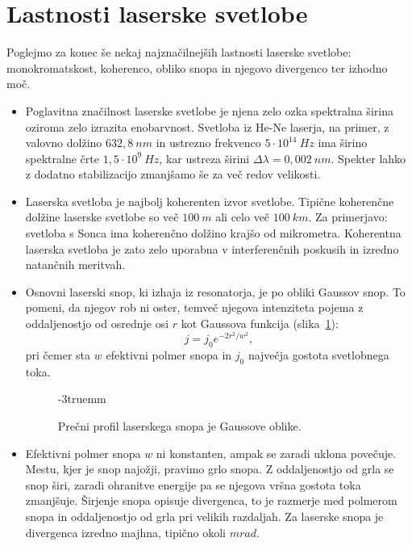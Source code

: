 \section{Lastnosti laserske svetlobe}
Poglejmo za konec še nekaj najznačilnejših lastnosti laserske svetlobe: 
monokromatskost, koherenco, obliko snopa in njegovo divergenco ter izhodno moč. 
\begin{itemize}
\item Poglavitna značilnost laserske svetlobe je njena zelo ozka 
spektralna
širina oziroma zelo izrazita enobarvnost. Svetloba iz He-Ne laserja,
na primer, z valovno dolžino $632,8~\si{nm}$ in ustrezno frekvenco $
5 \cdot 10^{14}~\si{Hz}$ ima širino spektralne črte 
$1,5 \cdot 10^{9}~\si{Hz}$, kar ustreza širini $\Delta \lambda = 0,002~\si{nm}$.
Spekter lahko z dodatno stabilizacijo 
zmanjšamo še za več redov velikosti. 

\item Laserska svetloba je najbolj koherenten izvor svetlobe. Tipične 
koherenčne dolžine laserske svetlobe so več $100~\si{m}$ ali celo
več $100~\si{km}$. Za primerjavo: svetloba s Sonca ima koherenčno dolžino
krajšo od mikrometra. Koherentna laserska svetloba je zato zelo uporabna
v interferenčnih poskusih in izredno natančnih meritvah.

\item Osnovni laserski snop, ki izhaja iz resonatorja, je po obliki
Gaussov snop. To pomeni, da njegov rob ni oster, temveč njegova 
intenziteta pojema z oddaljenostjo
od osrednje osi $r$ kot Gaussova funkcija (slika~\ref{fig:11_Gauss}):
\begin{equation}
j = j_0 e^{-2r^2/w^2},
\end{equation}
pri čemer sta $w$ efektivni polmer snopa in $j_0$ največja gostota
svetlobnega toka. 
\begin{figure}[ht!]
\centering
\def\svgwidth{60truemm} 

\caption{Prečni profil laserskega snopa je Gaussove oblike.
}
\label{fig:11_Gauss}
\vglue-3truemm
\end{figure}
\item Efektivni polmer snopa $w$ ni konstanten, ampak
se zaradi uklona povečuje. Mestu, kjer je snop najožji, pravimo grlo snopa.
Z oddaljenostjo od grla se snop širi, zaradi ohranitve energije pa 
se njegova vršna gostota toka zmanjšuje. Širjenje snopa opisuje divergenca, to je razmerje med 
polmerom  snopa in oddaljenostjo od grla pri velikih razdaljah. 
Za laserske snopa je divergenca izredno majhna, tipično okoli $\si{mrad}$.


\end{itemize}
